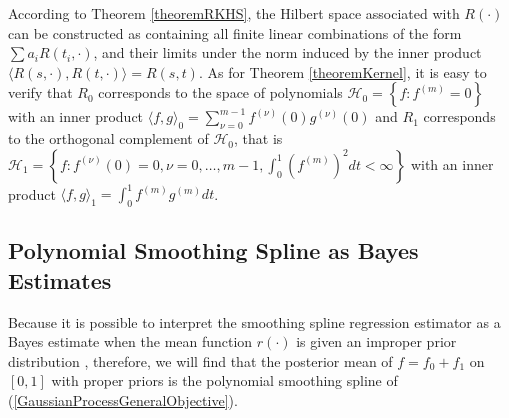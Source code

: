According to Theorem \ref{theoremRKHS}, the Hilbert space associated with $R(\cdot)$ can be constructed as containing all finite linear combinations of the form $\sum a_iR(t_i,\cdot)$, and their limits under the norm induced by the inner product $\langle R(s,\cdot),R(t,\cdot) \rangle = R(s,t)$. As for Theorem \ref{theoremKernel}, it is easy to verify that $R_0$ corresponds to the space of polynomials $\mathcal{H}_0 =\left\lbrace f:f^{(m)}=0\right\rbrace$ with an inner product $\langle f, g \rangle_0 = \sum_{\nu=0}^{m-1} f^{(\nu)}(0)g^{(\nu)}(0)$ and $R_1$ corresponds to the orthogonal complement of $\mathcal{H}_0$, that is $\mathcal{H}_1 =\left\lbrace   f:f^{(\nu)}(0)=0,\nu = 0, \ldots,m-1, \int_{0}^{1}(f^{(m)})^2dt <\infty  \right\rbrace$ with an inner product $\langle f, g\rangle_1 = \int_{0}^{1}f^{(m)}g^{(m)}dt $. 






\subsection{Polynomial Smoothing Spline as Bayes Estimates}

Because it is possible to interpret the smoothing spline regression estimator as a Bayes estimate when the mean function $r(\cdot)$ is given an improper prior distribution \cite{wahba1990spline} \cite{berlinet2011reproducing}, therefore, we will find that the posterior mean of $f=f_0+f_1$ on $[0,1]$ with proper priors is the polynomial smoothing  spline of (\ref{GaussianProcessGeneralObjective}). 

